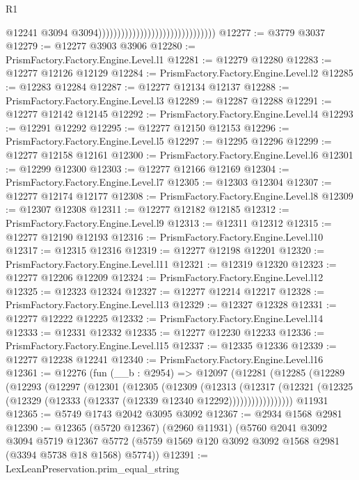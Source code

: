 \begin{lexlean}{R1}
\begin{coremodule}
                                                                  @12241
                                                                  @3094
                                                                  @3094)))))))))))))))))))))))))))))))
@12277 := @3779 @3037
@12279 := @12277 @3903 @3906
@12280 := PrismFactory.Factory.Engine.Level.l1
@12281 := @12279 @12280
@12283 := @12277 @12126 @12129
@12284 := PrismFactory.Factory.Engine.Level.l2
@12285 := @12283 @12284
@12287 := @12277 @12134 @12137
@12288 := PrismFactory.Factory.Engine.Level.l3
@12289 := @12287 @12288
@12291 := @12277 @12142 @12145
@12292 := PrismFactory.Factory.Engine.Level.l4
@12293 := @12291 @12292
@12295 := @12277 @12150 @12153
@12296 := PrismFactory.Factory.Engine.Level.l5
@12297 := @12295 @12296
@12299 := @12277 @12158 @12161
@12300 := PrismFactory.Factory.Engine.Level.l6
@12301 := @12299 @12300
@12303 := @12277 @12166 @12169
@12304 := PrismFactory.Factory.Engine.Level.l7
@12305 := @12303 @12304
@12307 := @12277 @12174 @12177
@12308 := PrismFactory.Factory.Engine.Level.l8
@12309 := @12307 @12308
@12311 := @12277 @12182 @12185
@12312 := PrismFactory.Factory.Engine.Level.l9
@12313 := @12311 @12312
@12315 := @12277 @12190 @12193
@12316 := PrismFactory.Factory.Engine.Level.l10
@12317 := @12315 @12316
@12319 := @12277 @12198 @12201
@12320 := PrismFactory.Factory.Engine.Level.l11
@12321 := @12319 @12320
@12323 := @12277 @12206 @12209
@12324 := PrismFactory.Factory.Engine.Level.l12
@12325 := @12323 @12324
@12327 := @12277 @12214 @12217
@12328 := PrismFactory.Factory.Engine.Level.l13
@12329 := @12327 @12328
@12331 := @12277 @12222 @12225
@12332 := PrismFactory.Factory.Engine.Level.l14
@12333 := @12331 @12332
@12335 := @12277 @12230 @12233
@12336 := PrismFactory.Factory.Engine.Level.l15
@12337 := @12335 @12336
@12339 := @12277 @12238 @12241
@12340 := PrismFactory.Factory.Engine.Level.l16
@12361 := @12276
    (fun (__b : @2954) =>
    @12097
      (@12281
        (@12285
          (@12289
            (@12293
              (@12297
                (@12301
                  (@12305
                    (@12309
                      (@12313
                        (@12317
                          (@12321
                            (@12325 (@12329 (@12333 (@12337 (@12339 @12340 @12292)))))))))))))))))
    @11931
@12365 := @5749 @1743 @2042 @3095 @3092
@12367 := @2934 @1568 @2981
@12390 := @12365
    (@5720 @12367)
    (@2960 @11931)
    (@5760
      @2041
      @3092
      @3094
      @5719
      @12367
      @5772
      (@5759 @1569 @120 @3092 @3092 @1568 @2981 (@3394 @5738 @18 @1568) @5774))
@12391 := LexLeanPreservation.prim_equal_string

\end{coremodule}
\end{lexlean}
